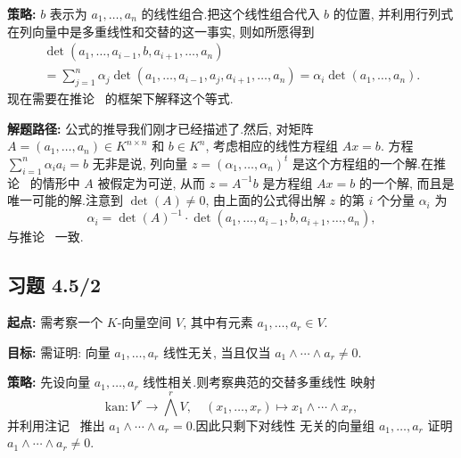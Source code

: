 \noindent\textbf{策略:} $b$ 表示为 $a_1, \ldots, a_n$ 的线性组合.把这个线性组合代入
$b$ 的位置, 并利用行列式在列向量中是多重线性和交替的这一事实, 则如所愿得到
\[
\begin{array}{c}
\det(a_1, \ldots, a_{i-1}, b, a_{i+1}, \ldots, a_n) \\
= \sum_{j=1}^{n} \alpha_j \det(a_1, \ldots, a_{i-1}, a_j, a_{i+1}, \ldots, a_n) = \alpha_i \det(a_1, \ldots, a_n)\text{.}
\end{array}
\]
现在需要在推论~ 的框架下解释这个等式.

\noindent\textbf{解题路径:} 公式的推导我们刚才已经描述了.然后, 对矩阵 $A = (a_1,
\ldots, a_n) \in K^{n \times n}$ 和 $b \in K^n$, 考虑相应的线性方程组 $Ax = b$.
方程 $\sum_{i=1}^{n} \alpha_i a_i = b$ 无非是说, 列向量 $z = (\alpha_1, \ldots,
\alpha_n)^t$ 是这个方程组的一个解.在推论~ 的情形中 $A$ 被假定为可逆,
从而 $z = A^{-1} b$ 是方程组 $Ax = b$ 的一个解, 而且是唯一可能的解.注意到
$\det(A) \neq 0$, 由上面的公式得出解 $z$ 的第 $i$ 个分量 $\alpha_i$ 为
\[
\alpha_i = \det(A)^{-1} \cdot \det(a_1, \ldots, a_{i-1}, b, a_{i+1}, \ldots, a_n),
\]
与推论~ 一致.

\subsection*{习题 4.5/2}

\noindent\textbf{起点:} 需考察一个 $K$-向量空间 $V$, 其中有元素 $a_1, \ldots, a_r
\in V$.

\noindent\textbf{目标:} 需证明: 向量 $a_1, \ldots, a_r$ 线性无关, 当且仅当
$a_1 \wedge \cdots \wedge a_r \neq 0$.

\noindent\textbf{策略:} 先设向量 $a_1, \ldots, a_r$ 线性相关.则考察典范的交替多重线性
映射
\[
\mathrm{kan} \colon V^r \longrightarrow \bigwedge^r V, \quad (x_1, \ldots, x_r) \longmapsto x_1 \wedge \cdots \wedge x_r,
\]
并利用注记~ 推出 $a_1 \wedge \cdots \wedge a_r = 0$.因此只剩下对线性
无关的向量组 $a_1, \ldots, a_r$ 证明 $a_1 \wedge \cdots \wedge a_r \neq 0$.

